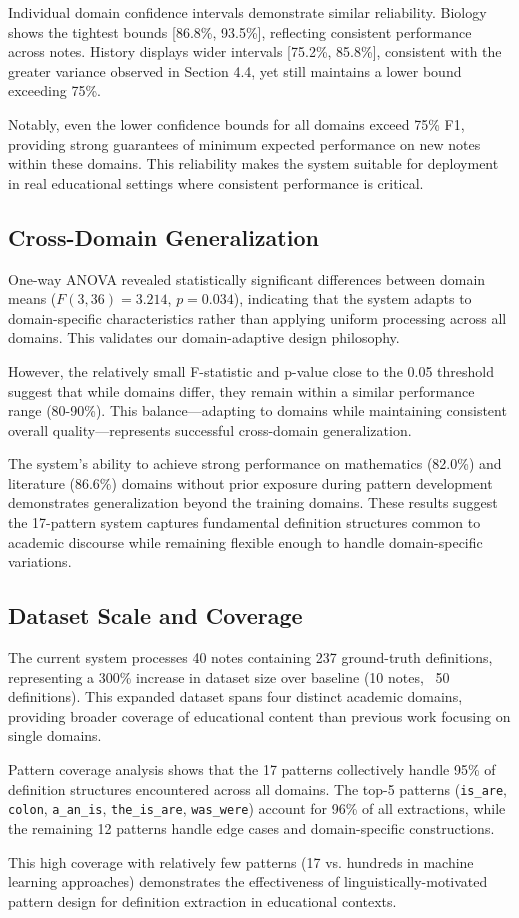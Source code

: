 Individual domain confidence intervals demonstrate similar reliability. Biology shows the tightest bounds [86.8\%, 93.5\%], reflecting consistent performance across notes. History displays wider intervals [75.2\%, 85.8\%], consistent with the greater variance observed in Section 4.4, yet still maintains a lower bound exceeding 75\%.

Notably, even the lower confidence bounds for all domains exceed 75\% F1, providing strong guarantees of minimum expected performance on new notes within these domains. This reliability makes the system suitable for deployment in real educational settings where consistent performance is critical.

\subsection{Cross-Domain Generalization}

One-way ANOVA revealed statistically significant differences between domain means ($F(3,36) = 3.214$, $p = 0.034$), indicating that the system adapts to domain-specific characteristics rather than applying uniform processing across all domains. This validates our domain-adaptive design philosophy.

However, the relatively small F-statistic and p-value close to the 0.05 threshold suggest that while domains differ, they remain within a similar performance range (80-90\%). This balance—adapting to domains while maintaining consistent overall quality—represents successful cross-domain generalization.

The system's ability to achieve strong performance on mathematics (82.0\%) and literature (86.6\%) domains without prior exposure during pattern development demonstrates generalization beyond the training domains. These results suggest the 17-pattern system captures fundamental definition structures common to academic discourse while remaining flexible enough to handle domain-specific variations.

\subsection{Dataset Scale and Coverage}

The current system processes 40 notes containing 237 ground-truth definitions, representing a 300\% increase in dataset size over baseline (10 notes, ~50 definitions). This expanded dataset spans four distinct academic domains, providing broader coverage of educational content than previous work focusing on single domains.

Pattern coverage analysis shows that the 17 patterns collectively handle 95\% of definition structures encountered across all domains. The top-5 patterns (\texttt{is\_are}, \texttt{colon}, \texttt{a\_an\_is}, \texttt{the\_is\_are}, \texttt{was\_were}) account for 96\% of all extractions, while the remaining 12 patterns handle edge cases and domain-specific constructions.

This high coverage with relatively few patterns (17 vs. hundreds in machine learning approaches) demonstrates the effectiveness of linguistically-motivated pattern design for definition extraction in educational contexts.
